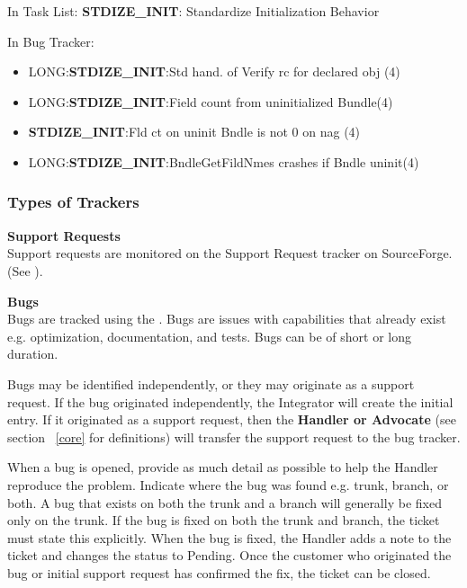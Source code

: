 \vspace{2mm}
In Task List: {\bf STDIZE\_INIT}: Standardize Initialization Behavior

\vspace{2mm}
In Bug Tracker:
\begin{itemize}
\item LONG:{\bf STDIZE\_INIT}:Std hand. of Verify rc for declared obj (4)
\item LONG:{\bf STDIZE\_INIT}:Field count from uninitialized Bundle(4)
\item {\bf STDIZE\_INIT}:Fld ct on uninit Bndle is not 0 on nag (4)
\item LONG:{\bf STDIZE\_INIT}:BndleGetFildNmes crashes if Bndle uninit(4)
\end{itemize}

\subsubsection{Types of Trackers}
\label{sec:trackertypes}
{\bf Support Requests}\\

Support requests are monitored on the Support Request tracker on SourceForge. 
(See ). 

{\bf Bugs}\\

Bugs are tracked using the . Bugs are issues with capabilities that already exist e.g. optimization, documentation, and tests. Bugs can be of short or long duration.  

Bugs may be identified independently, or they may originate as a support request. If the bug originated independently, the Integrator will create the initial entry. If it originated as a support request, then the {\bf Handler or Advocate} (see section ~\ref{core} for definitions) will transfer the support request to the bug tracker. 

When a bug is opened, provide as much detail as possible to help the Handler reproduce the problem. Indicate where the bug was found e.g. trunk, branch, or both. A bug that exists on both the trunk and a branch will generally be fixed only on the trunk. If the bug is fixed on both the trunk and branch, the ticket must  state this explicitly. When the bug is fixed, the Handler adds a note to the ticket and changes the status to Pending. Once the customer who originated the bug or initial support request has confirmed the fix, the ticket can be closed.\\ 

